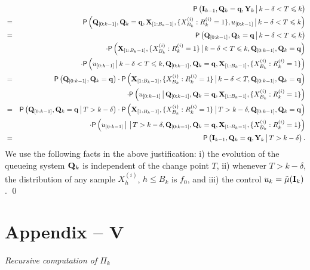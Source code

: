 \documentclass[acmtosn]{acmtrans2m}
\newcommand{\prob}[1]{\mathsf{P}\left(#1\right)}
\newcommand{\nn}{\nonumber \\}
{\theorembodyfont{\rmfamily}
\newtheorem{remarks}{Remark}[section]} \newtheorem{theorem}{Theorem}
\begin{document}
\begin{eqnarray*}
& & \prob{ {\bf I}_{k-1}, {\bf Q}_k = {\bf q}, {\bf Y}_k  \big\arrowvert k-\delta < T \leqslant k} \\ 
& = & \prob{ {\bf Q}_{[0:k-1]},  {\bf Q}_k = {\bf q},  {\bf X}_{[1:B_{k}-1]}, \{{X}^{(i)}_{B_{k}} : R_{k}^{(i)} =1\}, u_{[0:k-1]}\big\arrowvert k-\delta < T \leqslant k}\\
& = & \prob{ {\bf Q}_{[0:k-1]}, {\bf Q}_k = {\bf q}  \big\arrowvert
k-\delta < T \leqslant k}\nn
&  & \cdot
      \prob{ {\bf X}_{[1:B_{k}-1]}, \{{X}^{(i)}_{B_{k}} : R_{k}^{(i)}
	  =1\} \big\arrowvert k-\delta < T \leqslant k, {\bf Q}_{[0:k-1]}, {\bf Q}_k = {\bf q} }\nn
& &  \cdot 
      \prob{ u_{[0:k-1]} \big\arrowvert k-\delta < T \leqslant k,  {\bf
	  Q}_{[0:k-1]}, {\bf Q}_k = {\bf q}, {\bf X}_{[1:B_{k}-1]}, \{{X}^{(i)}_{B_{k}} : R_{k}^{(i)} =1\}}\\
& = & \prob{ {\bf Q}_{[0:k-1]}, {\bf Q}_k = {\bf q} }\cdot
      \prob{ {\bf X}_{[1:B_{k}-1]}, \{{X}^{(i)}_{B_{k}} : R_{k}^{(i)}
	  =1\} \big\arrowvert k-\delta < T, {\bf Q}_{[0:k-1]}, {\bf Q}_k = {\bf q} }\nn
& &  \cdot 
      \prob{ u_{[0:k-1]} \big\arrowvert {\bf Q}_{[0:k-1]}, {\bf Q}_k = {\bf q},  {\bf X}_{[1:B_{k}-1]}, \{{X}^{(i)}_{B_{k}} : R_{k}^{(i)} =1\}}\\
& = & \prob{ {\bf Q}_{[0:k-1]}, {\bf Q}_k = {\bf q}\big\arrowvert T > k-\delta  }\cdot
      \prob{ {\bf X}_{[1:B_{k}-1]}, \{{X}^{(i)}_{B_{k}} : R_{k}^{(i)}
	  =1\} \big\arrowvert T > k-\delta, {\bf Q}_{[0:k-1]},{\bf Q}_k = {\bf q} }\nn
& & \ \ \cdot 
      \prob{ u_{[0:k-1]} \big\arrowvert \big\arrowvert T > k-\delta ,
	  {\bf Q}_{[0:k-1]}, {\bf Q}_k = {\bf q},  {\bf X}_{[1:B_{k}-1]}, \{{X}^{(i)}_{B_{k}} : R_{k}^{(i)} =1\}}\\
& =  & \prob{ {\bf I}_{k-1}, {\bf Q}_k = {\bf q}, {\bf Y}_k  \big\arrowvert T > k-\delta }. 
\end{eqnarray*}
We use the following facts in the above justification: i) the 
evolution of the queueing system ${\bf Q}_k$ is independent of 
the change point $T$, ii) whenever $T > k-\delta$, the distribution 
of any sample $X^{(i)}_{h}$, $h \leqslant B_k$ is $f_0$, and 
iii) the control $u_k = 
\tilde{\mu}({\bf I}_k)$. 
\qed









\section*{Appendix -- V}
\emph{Recursive computation of $\Pi_k$}
\end{document}
